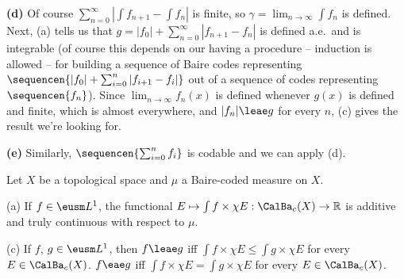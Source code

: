 {\medskip

{\bf (d)} Of course $\sum_{n=0}^{\infty}|\int f_{n+1}-\int f_n|$ is finite,
so $\gamma=\lim_{n\to\infty}\int f_n$ is defined.
Next, (a) tells us that $g=|f_0|+\sum_{n=0}^{\infty}|f_{n+1}-f_n|$ is
defined a.e.\ and is integrable (of course this depends on our having a
procedure -- induction is allowed -- for building a sequence of Baire codes
representing $\sequencen{|f_0|+\sum_{i=0}^n|f_{i+1}-f_i|}$ out of a
sequence of codes representing $\sequencen{f_n}$).
Since $\lim_{n\to\infty}f_n(x)$ is
defined whenever $g(x)$ is defined and finite, which is almost everywhere,
and $|f_n|\leae g$ for every $n$, (c) gives the result we're looking for.

\medskip

{\bf (e)} Similarly, $\sequencen{\sum_{i=0}^nf_i}$ is
codable and we can apply (d).
}%

 Let $X$ be a
topological space and $\mu$ a Baire-coded measure on $X$.

(a) If $f\in\eusm L^1$, the functional
$E\mapsto\int f\times\chi E:\CalBa_c(X)\to\Bbb R$ is additive and truly
continuous with respect to $\mu$.

(c) If $f$, $g\in\eusm L^1$, then $f\leae g$ iff
$\int f\times\chi E\le\int g\times\chi E$ for every $E\in\CalBa_c(X)$.
$f\eae g$ iff
$\int f\times\chi E=\int g\times\chi E$ for every $E\in\CalBa_c(X)$.

